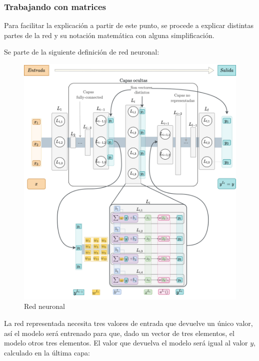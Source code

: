 \subsubsection{Trabajando con matrices}\label{workingwithmatrixes}
Para facilitar la explicación a partir de este punto, se procede a explicar distintas partes de la red y su notación matemática con alguna simplificación.
\newline

Se parte de la siguiente definición de red neuronal:

\begin{figure}[H]
    \centering
    \includegraphics[width=16cm]{images/state-of-art/matrixes/layer_activation_representation.png}
    \caption{Red neuronal}
    \label{fig:basic_network51}
\end{figure}

La red representada necesita tres valores de entrada que devuelve un único valor, así el modelo será entrenado para que, dado un vector de tres elementos, el modelo otros tres elementos. El valor que devuelva el modelo será igual al valor $y$, calculado en la última capa:

